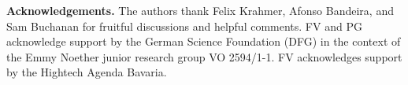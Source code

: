 \documentclass[10pt, reqno]{amsart}
\theoremstyle{plain}
\theoremstyle{definition} %
\theoremstyle{remark} %
\numberwithin{equation}{section}
\begin{document}
\maketitle








\appendix










\textbf{Acknowledgements.} 
The authors thank Felix Krahmer, Afonso Bandeira, and Sam Buchanan for fruitful discussions and helpful comments.
FV and PG acknowledge support by
the German Science Foundation (DFG) in the context of the Emmy Noether junior research
group VO 2594/1-1.
FV acknowledges support by the Hightech Agenda Bavaria. 

\printbibliography
\end{document}
